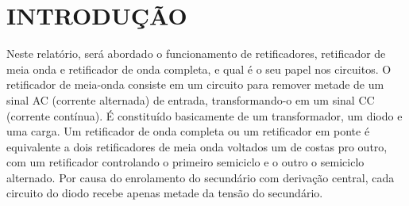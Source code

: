 \chapter{INTRODUÇÃO}

Neste relatório, será abordado o funcionamento de retificadores, retificador de meia onda e retificador de onda completa, e qual é o seu papel nos circuitos. O retificador de meia-onda consiste em um circuito para remover metade de um sinal AC (corrente alternada) de entrada, transformando-o em um sinal CC (corrente contínua). É constituído basicamente de um transformador, um diodo e uma carga. Um retificador de onda completa ou um retificador em ponte é equivalente a dois retificadores de meia onda voltados um de costas pro outro, com um retificador controlando o primeiro semiciclo e o outro o semiciclo alternado. Por causa do enrolamento do secundário com derivação central, cada circuito do diodo recebe apenas metade da tensão do secundário.
